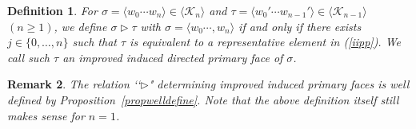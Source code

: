 \documentclass[a4paper,12pt]{article}
\newtheorem{definition}{Definition}[section]
\newtheorem{remark}[definition]{Remark}
\newcommand{\bra}{\langle}
\newcommand{\ket}{\rangle}
\numberwithin{equation}{section}
\begin{document}
\begin{definition}\rm
For $\sigma=\langle w_0\cdots w_{n} \rangle\in \langle \mathcal{K}_n\rangle$ and 
$\tau=\langle w_0'\cdots w_{n-1}' \rangle\in \langle \mathcal{K}_{n-1}\rangle$ $(n\geq 1)$, we define 
$\sigma \triangleright \tau$ with $\sigma=\bra w_0\cdots,w_n \ket$ if and only if there exists $j\in \{0,\dots,n\}$ such that 
$\tau$ is equivalent to a representative element in (\ref{iipp}). 
We call such $\tau$ an improved induced directed primary face of $\sigma$. 
\end{definition}
\begin{remark}
The relation  \lq\lq \;$\triangleright$" determining improved induced primary faces is well defined by Proposition~\ref{propwelldefine}. 
Note that the above definition itself still makes sense for $n=1$.
\end{remark}
%
\end{document}
